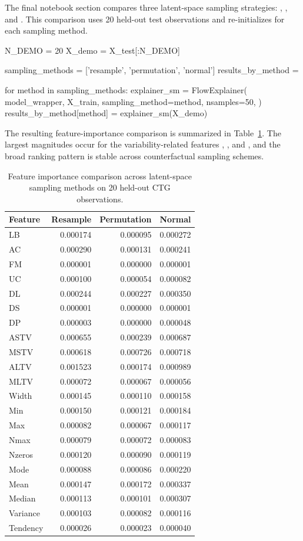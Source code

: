 The final notebook section compares three latent-space sampling strategies:
, , and . This comparison uses
20 held-out test observations and re-initializes  for
each sampling method.
%
\begin{Code}
N_DEMO = 20
X_demo = X_test[:N_DEMO]

sampling_methods = ['resample', 'permutation', 'normal']
results_by_method = {}

for method in sampling_methods:
    explainer_sm = FlowExplainer(
        model_wrapper,
        X_train,
        sampling_method=method,
        nsamples=50,
    )
    results_by_method[method] = explainer_sm(X_demo)
\end{Code}
%
The resulting feature-importance comparison is summarized in
Table~\ref{tab:sampling-methods}. The largest magnitudes occur for the
variability-related features , , and , and
the broad ranking pattern is stable across counterfactual sampling schemes.

\begin{table}[t!]
\centering
\begin{tabular}{lrrr}
\hline
Feature & Resample & Permutation & Normal \\ \hline
LB & 0.000174 & 0.000095 & 0.000272 \\
AC & 0.000290 & 0.000131 & 0.000241 \\
FM & 0.000001 & 0.000000 & 0.000001 \\
UC & 0.000100 & 0.000054 & 0.000082 \\
DL & 0.000244 & 0.000227 & 0.000350 \\
DS & 0.000001 & 0.000000 & 0.000001 \\
DP & 0.000003 & 0.000000 & 0.000048 \\
ASTV & 0.000655 & 0.000239 & 0.000687 \\
MSTV & 0.000618 & 0.000726 & 0.000718 \\
ALTV & 0.001523 & 0.000174 & 0.000989 \\
MLTV & 0.000072 & 0.000067 & 0.000056 \\
Width & 0.000145 & 0.000110 & 0.000158 \\
Min & 0.000150 & 0.000121 & 0.000184 \\
Max & 0.000082 & 0.000067 & 0.000117 \\
Nmax & 0.000079 & 0.000072 & 0.000083 \\
Nzeros & 0.000120 & 0.000090 & 0.000119 \\
Mode & 0.000088 & 0.000086 & 0.000220 \\
Mean & 0.000147 & 0.000172 & 0.000337 \\
Median & 0.000113 & 0.000101 & 0.000307 \\
Variance & 0.000103 & 0.000082 & 0.000116 \\
Tendency & 0.000026 & 0.000023 & 0.000040 \\ \hline
\end{tabular}
\caption{\label{tab:sampling-methods} Feature importance comparison across
latent-space sampling methods on 20 held-out CTG observations.}
\end{table}

